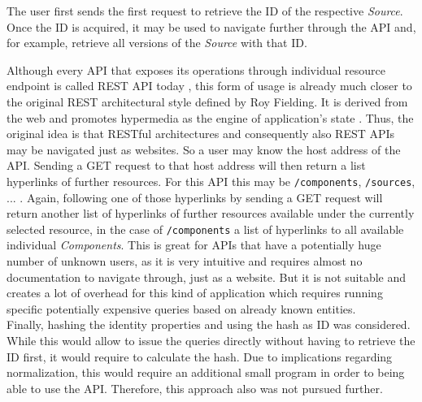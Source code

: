 The user first sends the first request to retrieve the ID of the respective \emph{Source}. Once the ID is acquired, it may be used to navigate further through the API and, for example, retrieve all versions of the \emph{Source} with that ID.\par
Although every API that exposes its operations through individual resource endpoint is called REST API today \cite{RichardsonMaturityModel}, this form of usage is already much closer to the original REST architectural style defined by Roy Fielding. It is derived from the web and promotes hypermedia as the engine of application's state \cite{RESTArchitecturalStyle}. Thus, the original idea is that RESTful architectures and consequently also REST APIs may be navigated just as websites. So a user may know the host address of the API. Sending a GET request to that host address will then return a list hyperlinks of further resources. For this API this may be \lstinline|/components|, \lstinline|/sources|, ... . Again, following one of those hyperlinks by sending a GET request will return another list of hyperlinks of further resources available under the currently selected resource, in the case of \lstinline|/components| a list of hyperlinks to all available individual \emph{Components}. This is great for APIs that have a potentially huge number of unknown users, as it is very intuitive and requires almost no documentation to navigate through, just as a website. But it is not suitable and creates a lot of overhead for this kind of application which requires running specific potentially expensive queries based on already known entities.\\

Finally, hashing the identity properties and using the hash as ID was considered. While this would allow to issue the queries directly without having to retrieve the ID first, it would require to calculate the hash. Due to implications regarding normalization, this would require an additional small program in order to being able to use the API. Therefore, this approach also was not pursued further.

